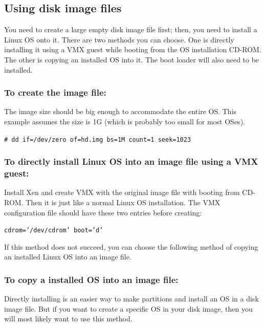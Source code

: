 \documentclass[11pt,twoside,final,openright]{report}
\begin{document}
\subsection{Using disk image files}
You need to create a large empty disk image file first; then, you need to install a Linux OS onto it. There are two methods you can choose. One is directly installing it using a VMX guest while booting from the OS installation CD-ROM. The other is copying an installed OS into it. The boot loader will also need to be installed.

\subsubsection*{To create the image file:}
The image size should be big enough to accommodate the entire OS. This example assumes the size is 1G (which is probably too small for most OSes).

{\small {\tt \# dd if=/dev/zero of=hd.img bs=1M count=1 seek=1023}}

\subsubsection*{To directly install Linux OS into an image file using a VMX guest:}

Install Xen and create VMX with the original image file with booting from CD-ROM. Then it is just like a normal Linux OS installation. The VMX configuration file should have these two entries before creating:

{\small {\tt cdrom='/dev/cdrom'
boot='d'}}

If this method does not succeed, you can choose the following method of copying an installed Linux OS into an image file.

\subsubsection*{To copy a installed OS into an image file:}
Directly installing is an easier way to make partitions and install an OS in a disk image file. But if you want to create a specific OS in your disk image, then you will most likely want to use this method.
\end{document}
